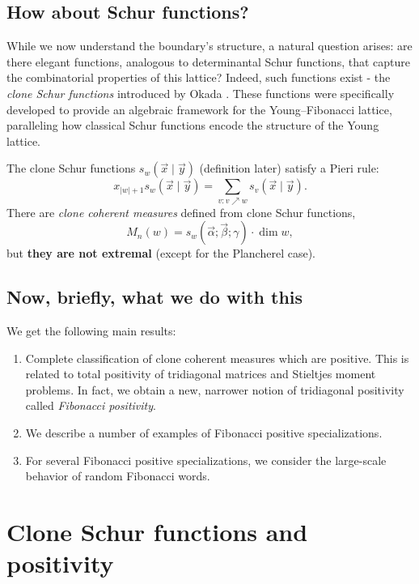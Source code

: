 \documentclass[letterpaper,11pt,oneside,reqno]{article}
\numberwithin{equation}{section}
\theoremstyle{definition}
\begin{document}
\subsection{How about Schur functions?}

While we now understand the boundary's structure, a natural question arises: are there
elegant functions, analogous to determinantal Schur functions, that capture the
combinatorial properties of this lattice? Indeed, such functions exist - the
\emph{clone Schur functions} introduced by Okada \cite{okada1994algebras}. These
functions were specifically developed to provide an algebraic framework for the
Young--Fibonacci lattice, paralleling how classical Schur functions encode the
structure of the Young lattice.

The clone Schur functions $s_w(\vec x\mid \vec y)$
(definition later)
satisfy a Pieri rule:
\begin{equation*}
	x_{|w|+1}s_w(\vec x\mid \vec y)=\sum_{v\colon v\nearrow w}s_v(\vec x\mid \vec y).
\end{equation*}
There are \emph{clone coherent measures} defined from clone Schur functions,
\begin{equation*}
	M_n(w)=s_w(\vec \alpha;\vec \beta;\gamma)\cdot \dim w,
\end{equation*}
but \textbf{they are not extremal} (except for the Plancherel case).

\subsection{Now, briefly, what we do with this}

We get the following main results:
\begin{enumerate}
	\item Complete classification of
		clone coherent measures which are positive.
		This is related to total positivity of tridiagonal matrices and Stieltjes moment
		problems.
		In fact, we obtain a new, narrower notion of tridiagonal
		positivity called \emph{Fibonacci positivity}.
	\item We describe a number of examples of Fibonacci positive specializations.
	\item For several Fibonacci positive specializations, we consider the large-scale behavior of random Fibonacci words.
\end{enumerate}

\section{Clone Schur functions and positivity}
\end{document}
